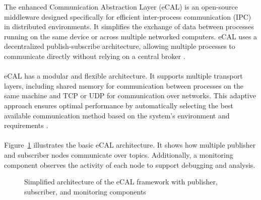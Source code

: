 The enhanced Communication Abstraction Layer (eCAL) is an open-source middleware designed specifically for efficient inter-process communication (IPC) in distributed environments. It simplifies the exchange of data between processes running on the same device or across multiple networked computers. eCAL uses a decentralized publish-subscribe architecture, allowing multiple processes to communicate directly without relying on a central broker \cite{ecal_github}.
\\
\\
eCAL has a modular and flexible architecture. It supports multiple transport layers, including shared memory for communication between processes on the same machine and TCP or UDP for communication over networks. This adaptive approach ensures optimal performance by automatically selecting the best available communication method based on the system's environment and requirements \cite{ecal_official_docs}.
\\
\\
Figure~\ref{fig:ecal_architecture} illustrates the basic eCAL architecture. It shows how multiple publisher and subscriber nodes communicate over topics. Additionally, a monitoring component observes the activity of each node to support debugging and analysis.
\\
\begin{figure}[H]
	\centering
	\caption{Simplified architecture of the eCAL framework with publisher, subscriber, and monitoring components}
	\label{fig:ecal_architecture}
\end{figure}

